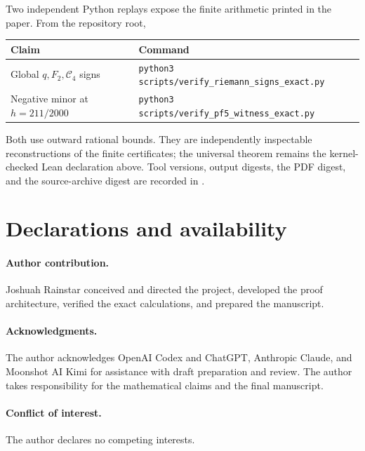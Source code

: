 \documentclass[11pt]{article}
\theoremstyle{remark}
\newcommand{\Cfour}{\mathcal{C}_4}
\numberwithin{equation}{section}
\begin{document}
Two independent Python replays expose the finite arithmetic printed in the
paper. From the repository root,
\begin{center}
\begin{tabular}{@{}ll@{}}
\toprule
Claim & Command \\
\midrule
Global \(q,F_2,\Cfour\) signs &
\texttt{python3 scripts/verify\_riemann\_signs\_exact.py} \\
Negative minor at \(h=211/2000\) &
\texttt{python3 scripts/verify\_pf5\_witness\_exact.py} \\
\bottomrule
\end{tabular}
\end{center}
Both use outward rational bounds. They are independently inspectable
reconstructions of the finite certificates; the universal theorem remains the
kernel-checked Lean declaration above. Tool versions, output digests, the PDF
digest, and the source-archive digest are recorded in
.
\section{Declarations and availability}

\paragraph{Author contribution.}
Joshuah Rainstar conceived and directed the project, developed the proof
architecture, verified the exact calculations, and prepared the manuscript.

\paragraph{Acknowledgments.}
The author acknowledges OpenAI Codex and ChatGPT, Anthropic Claude, and
Moonshot AI Kimi for assistance with draft preparation and review. The author
takes responsibility for the mathematical claims and the final manuscript.

\paragraph{Conflict of interest.}
The author declares no competing interests.
\end{document}
